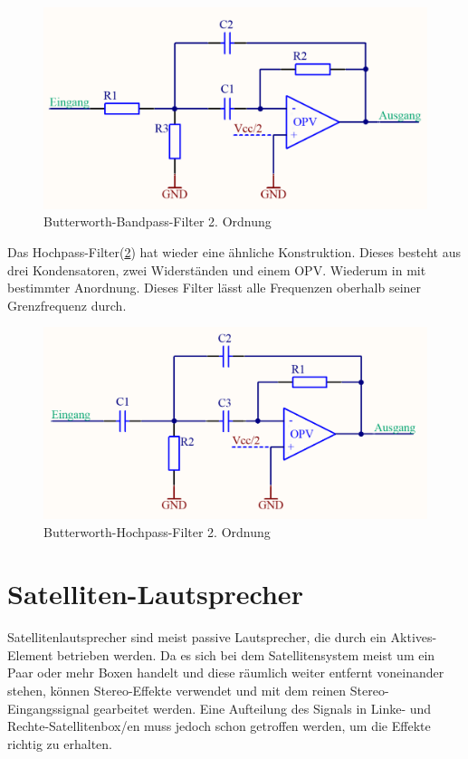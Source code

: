 \begin{figure} [H]
	\centering
	\includegraphics[width=1\textwidth]{img/Print4/BPFilter-Butterworth2Ordnung.PNG}
	\caption{Butterworth-Bandpass-Filter 2. Ordnung}
	\label {fig:3.3.2.2}
\end{figure}
Das Hochpass-Filter(\ref{fig:3.3.2.3}) hat wieder eine ähnliche Konstruktion. Dieses besteht aus drei Kondensatoren, zwei Widerständen und einem OPV. Wiederum in mit bestimmter Anordnung.  Dieses Filter lässt alle Frequenzen oberhalb seiner Grenzfrequenz durch.
\begin{figure} [H]
	\centering	
	\includegraphics[width=1\textwidth]{img/Print4/HPFilter-Butterworth2Ordnung.PNG}
	\caption{Butterworth-Hochpass-Filter 2. Ordnung}
	\label {fig:3.3.2.3}
\end{figure}

\section{Satelliten-Lautsprecher}\label{sec:3.4}
Satellitenlautsprecher sind meist passive Lautsprecher, die durch ein Aktives-Element betrieben werden. Da es sich bei dem Satellitensystem meist um ein Paar oder mehr Boxen handelt und diese räumlich weiter entfernt voneinander stehen, können Stereo-Effekte verwendet und mit dem reinen Stereo-Eingangssignal gearbeitet werden. Eine Aufteilung des Signals in Linke- und Rechte-Satellitenbox/en muss jedoch schon getroffen werden, um die Effekte richtig zu erhalten.

